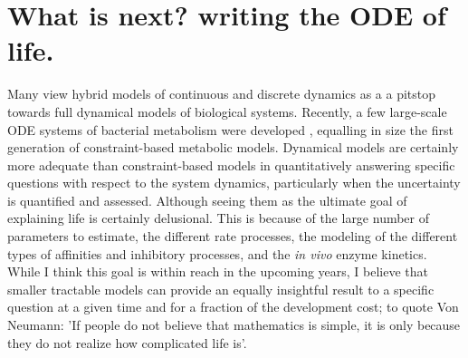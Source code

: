 \section{What is next? writing the ODE of life.}
Many view hybrid models of continuous and discrete dynamics as a a pitstop towards full dynamical models of biological systems. Recently, a few large-scale ODE systems of bacterial metabolism were developed \cite{khodayari2016genome,dash2017development}, equalling in size the first generation of constraint-based metabolic models. Dynamical models are certainly more adequate than constraint-based models in quantitatively answering specific questions with respect to the system dynamics, particularly when the uncertainty is quantified and assessed. Although seeing them as the ultimate goal of explaining life is certainly delusional. This is because of the large number of parameters to estimate, the different rate processes, the modeling of the different types of affinities and inhibitory processes,  and the \textit{in vivo} enzyme kinetics. While I think this goal is within reach in the upcoming years, I believe that smaller tractable models can provide an equally insightful result to a specific question at a given time and for a fraction of the development cost; to quote Von Neumann: 'If people do not believe that mathematics is simple, it is only because they do  not realize how complicated life is'.
